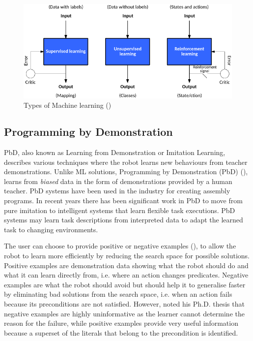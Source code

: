 
\begin{figure}[ht]
	\centering
	\includegraphics[width=\linewidth]{figures/ml-techniques}
	\caption{Types of Machine learning (\cite{jones2017models})}
	\label{fig:ml-types}
\end{figure}

\subsection{Programming by Demonstration}\label{sssec:PbD}
PbD, also known as Learning from Demonstration or Imitation Learning, describes various techniques where the robot learns new behaviours from teacher demonstrations. 
Unlike ML solutions, Programming by Demonstration (PbD) (\cite{billard2016learning,argall2009survey}), learns from \textit{biased} data in the form of demonstrations provided by a human teacher.
PbD systems have been used in the industry for creating assembly programs. 
In recent years there has been significant work in PbD to move from pure imitation to intelligent systems that learn flexible task executions. 
PbD systems may learn task descriptions from interpreted data to adapt the learned task to changing environments.

The user can choose to provide positive or negative examples (\cite{grollman2012robot}), to allow the robot to learn more efficiently by reducing the search space for possible solutions.
Positive examples are demonstration data showing what the robot should do and what it can learn directly from, i.e. where an action changes predicates.
Negative examples are what the robot should avoid but should help it to generalise faster by eliminating bad solutions from the search space, i.e. when an action fails because its preconditions are not satisfied.
However, \cite{walsh2010efficient} noted his Ph.D. thesis that negative examples are highly uninformative as the learner cannot determine the reason for the failure, while positive examples provide very useful information because a superset of the literals that belong to the precondition is identified.

